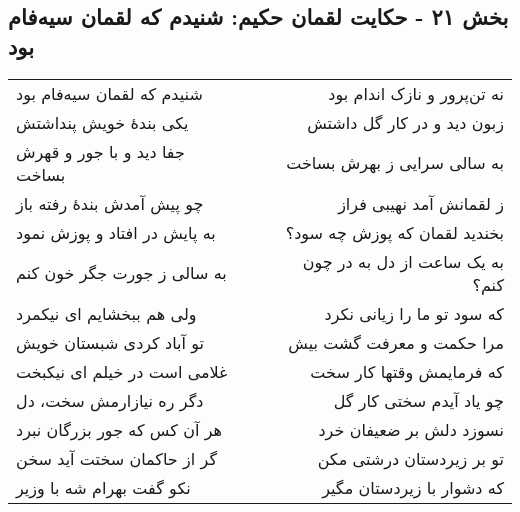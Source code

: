 \begin{center}
\section*{بخش ۲۱ - حکایت لقمان حکیم: شنیدم که لقمان سیه‌فام بود}
\label{sec:021}
\begin{longtable}{l p{0.5cm} r}
شنیدم که لقمان سیه‌فام بود
&&
نه تن‌پرور و نازک اندام بود
\\
یکی بندهٔ خویش پنداشتش
&&
زبون دید و در کار گل داشتش
\\
جفا دید و با جور و قهرش بساخت
&&
به سالی سرایی ز بهرش بساخت
\\
چو پیش آمدش بندهٔ رفته باز
&&
ز لقمانش آمد نهیبی فراز
\\
به پایش در افتاد و پوزش نمود
&&
بخندید لقمان که پوزش چه سود؟
\\
به سالی ز جورت جگر خون کنم
&&
به یک ساعت از دل به در چون کنم؟
\\
ولی هم ببخشایم ای نیکمرد
&&
که سود تو ما را زیانی نکرد
\\
تو آباد کردی شبستان خویش
&&
مرا حکمت و معرفت گشت بیش
\\
غلامی است در خیلم ای نیکبخت
&&
که فرمایمش وقتها کار سخت
\\
دگر ره نیازارمش سخت، دل
&&
چو یاد آیدم سختی کار گل
\\
هر آن کس که جور بزرگان نبرد
&&
نسوزد دلش بر ضعیفان خرد
\\
گر از حاکمان سختت آید سخن
&&
تو بر زیردستان درشتی مکن
\\
نکو گفت بهرام شه با وزیر
&&
که دشوار با زیردستان مگیر
\\
\end{longtable}
\end{center}

